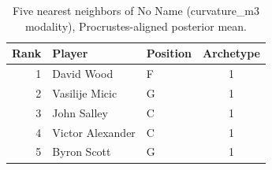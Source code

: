 \begin{table}[htbp]
  \centering\small
  \begin{tabular}{rllc}
    \toprule
    Rank & Player & Position & Archetype \\
    \midrule
    1 & David Wood & F & 1 \\
    2 & Vasilije Micic & G & 1 \\
    3 & John Salley & C & 1 \\
    4 & Victor Alexander & C & 1 \\
    5 & Byron Scott & G & 1 \\
    \bottomrule
  \end{tabular}
  \caption{Five nearest neighbors of No Name (curvature_m3 modality), Procrustes-aligned posterior mean.}
  \label{tab:No_Name_neighbors_curvature_m3}
\end{table}

